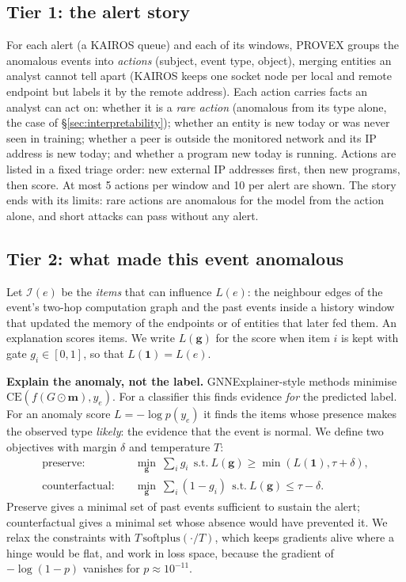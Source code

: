 \documentclass[conference]{IEEEtran}
\begin{document}
\subsection{Tier 1: the alert story}
For each alert (a KAIROS queue) and each of its windows, PROVEX groups the anomalous events into
\emph{actions} (subject, event type, object), merging entities an analyst cannot tell apart (KAIROS keeps
one socket node per local and remote endpoint but labels it by the remote address). Each action carries
facts an analyst can act on: whether it is a \emph{rare action} (anomalous from its type alone, the
\FracPriorEvents{} case of \S\ref{sec:interpretability}); whether an entity is new today or was never seen
in training; whether a peer is outside the monitored network and its IP address is new today; and whether
a program new today is running. Actions are listed in a fixed triage order: new external IP addresses
first, then new programs, then score. At most 5 actions per window and 10 per alert are shown. The story
ends with its limits: rare actions are anomalous for the model from the action alone, and short attacks
can pass without any alert.

\subsection{Tier 2: what made this event anomalous}
\label{sec:objectives}
Let $\mathcal{I}(e)$ be the \emph{items} that can influence $L(e)$: the neighbour edges of the event's
two-hop computation graph and the past events inside a history window that updated the memory of the
endpoints or of entities that later fed them. An explanation scores items. We write $L(\mathbf{g})$ for
the score when item $i$ is kept with gate $g_i\in[0,1]$, so that $L(\mathbf{1})=L(e)$.

\textbf{Explain the anomaly, not the label.} GNNExplainer-style methods minimise
$\mathrm{CE}(f(G\odot\mathbf m), y_e)$. For a classifier this finds evidence \emph{for} the predicted
label. For an anomaly score $L=-\log p(y_e)$ it finds the items whose presence makes the observed type
\emph{likely}: the evidence that the event is normal. We define two
objectives with margin $\delta$ and temperature $T$:
\begin{align}
\text{preserve:}\quad &\min_{\mathbf g}\ \textstyle\sum_i g_i \ \ \text{s.t.}\ L(\mathbf g)\ge\min(L(\mathbf 1),\tau+\delta),\\
\text{counterfactual:}\quad &\min_{\mathbf g}\ \textstyle\sum_i (1-g_i) \ \ \text{s.t.}\ L(\mathbf g)\le\tau-\delta.
\end{align}
Preserve gives a minimal set of past events sufficient to sustain the alert; counterfactual gives a
minimal set whose absence would have prevented it. We relax the constraints with
$T\,\mathrm{softplus}(\cdot/T)$, which keeps gradients alive where a hinge would be flat, and work in
loss space, because the gradient of $-\log(1-p)$ vanishes for $p\approx10^{-11}$.
\end{document}

